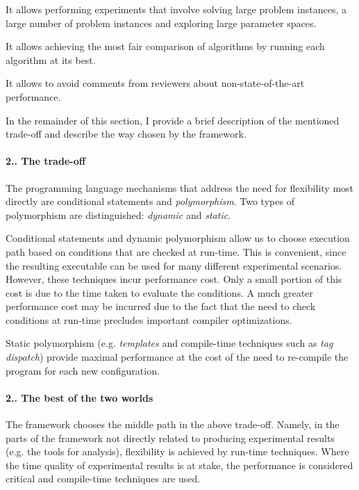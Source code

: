 \begin{DoxyItemize}
\item It allows performing experiments that involve solving large problem instances, a large number of problem instances and exploring large parameter spaces.
\item It allows achieving the most fair comparison of algorithms by running each algorithm at its best.
\item It allows to avoid comments from reviewers about non-\/state-\/of-\/the-\/art performance.
\end{DoxyItemize}

In the remainder of this section, I provide a brief description of the mentioned trade-\/off and describe the way chosen by the framework.\hypertarget{index_s-tradeoff}{}\paragraph{2.. The trade-\/off}\label{index_s-tradeoff}
The programming language mechanisms that address the need for flexibility most directly are conditional statements and {\itshape polymorphism}. Two types of polymorphism are distinguished\+: {\itshape dynamic} and {\itshape static}.

Conditional statements and dynamic polymorphism allow us to choose execution path based on conditions that are checked at run-\/time. This is convenient, since the resulting executable can be used for many different experimental scenarios. However, these techniques incur performance cost. Only a small portion of this cost is due to the time taken to evaluate the conditions. A much greater performance cost may be incurred due to the fact that the need to check conditions at run-\/time precludes important compiler optimizations.

Static polymorphism (e.\+g. {\itshape templates} and compile-\/time techniques such as {\itshape tag dispatch}) provide maximal performance at the cost of the need to re-\/compile the program for each new configuration.\hypertarget{index_s-configuration}{}\paragraph{2.. The best of the two worlds}\label{index_s-configuration}
The framework chooses the middle path in the above trade-\/off. Namely, in the parts of the framework not directly related to producing experimental results (e.\+g. the tools for analysis), flexibility is achieved by run-\/time techniques. Where the time quality of experimental results is at stake, the performance is considered critical and compile-\/time techniques are used.

